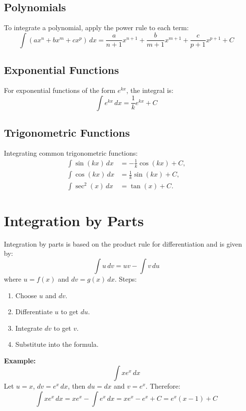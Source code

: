 \documentclass[]{article}
\begin{document}
	\subsection{Polynomials}
	To integrate a polynomial, apply the power rule to each term:
	\[
	\int (ax^n + bx^m + cx^p)\,dx = \frac{a}{n+1}x^{n+1} + \frac{b}{m+1}x^{m+1} + \frac{c}{p+1}x^{p+1} + C
	\]
	
	\subsection{Exponential Functions}
	For exponential functions of the form \( e^{kx} \), the integral is:
	\[
	\int e^{kx}\,dx = \frac{1}{k}e^{kx} + C
	\]
	
	\subsection{Trigonometric Functions}
	Integrating common trigonometric functions:
	\begin{align*}
		\int \sin(kx)\,dx &= -\frac{1}{k}\cos(kx) + C, \\
		\int \cos(kx)\,dx &= \frac{1}{k}\sin(kx) + C, \\
		\int \sec^2(x)\,dx &= \tan(x) + C.
	\end{align*}
	
	\section{Integration by Parts}
	Integration by parts is based on the product rule for differentiation and is given by:
	\[
	\int u\,dv = uv - \int v\,du
	\]
	where \( u = f(x) \) and \( dv = g(x)\,dx \). Steps:
	\begin{enumerate}
		\item Choose \( u \) and \( dv \).
		\item Differentiate \( u \) to get \( du \).
		\item Integrate \( dv \) to get \( v \).
		\item Substitute into the formula.
	\end{enumerate}
	\textbf{Example:}
	\[
	\int x e^x\,dx
	\]
	Let \( u = x \), \( dv = e^x\,dx \), then \( du = dx \) and \( v = e^x \). Therefore:
	\[
	\int x e^x\,dx = x e^x - \int e^x\,dx = x e^x - e^x + C = e^x(x-1) + C
	\]
	
\end{document}
